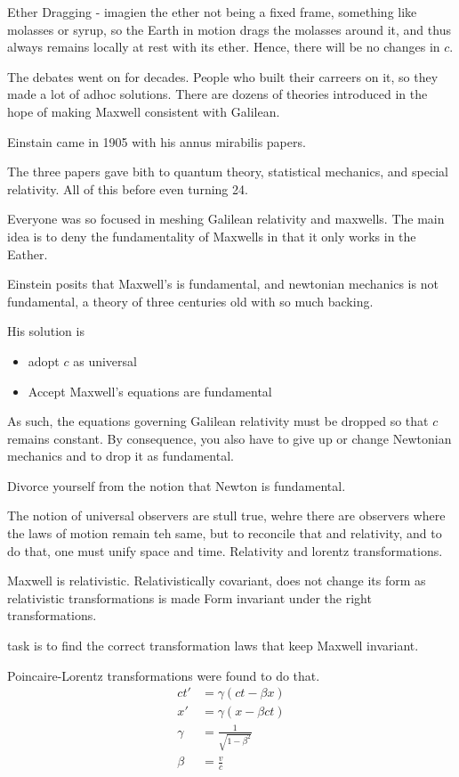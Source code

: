		Ether Dragging - imagien the ether not being a fixed frame, something like molasses or syrup, so the Earth in motion drags the molasses around it,
		and thus always remains locally at rest with its ether. Hence, there will be no changes in $c$.

		The debates went on for decades. People who built their carreers on it, so they made a lot of adhoc solutions.
		There are dozens of theories introduced in the hope of making Maxwell consistent with Galilean.

		Einstain came in 1905 with his annus mirabilis papers.

		The three papers gave bith to quantum theory, statistical mechanics, and special relativity. All of this before even
		turning 24.

		Everyone was so focused in meshing Galilean relativity and maxwells. The main idea is to deny the fundamentality of Maxwells
		in that it only works in the Eather.

		Einstein posits that Maxwell's is fundamental, and newtonian mechanics is not fundamental, a theory of three centuries old with so much backing.

		His solution is
		\begin{itemize}
			\item adopt $c$ as universal
			\item Accept Maxwell's equations are fundamental	
		\end{itemize}
		As such, the equations governing Galilean relativity must be dropped so that $c$ remains constant.
		By consequence, you also have to give up or change Newtonian mechanics and to drop it as fundamental.

		Divorce yourself from the notion that Newton is fundamental.

		The notion of universal observers are stull true, wehre there are observers where the laws of motion remain teh same, but to reconcile that and relativity,
		and to do that, one must unify space and time. Relativity and lorentz transformations.

		Maxwell is relativistic. Relativistically covariant, does not change its form as relativistic transformations is made
		Form invariant under the right transformations.

		task is to find the correct transformation laws that keep Maxwell invariant.

		Poincaire-Lorentz transformations were found to do that.
		\begin{align}
			ct'&= \gamma(ct-\beta x)\\
			x' &= \gamma(x - \beta c t)\\
			\gamma &= \frac{1}{\sqrt{1-\beta^2}} \\
			\beta &= \frac{v}{c}
		\end{align}

